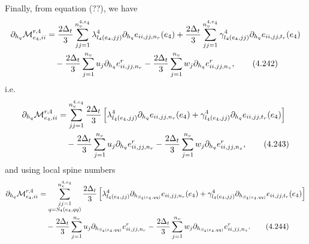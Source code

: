 \documentclass{article}
\begin{document}
Finally, from equation (??), we have
\begin{align}
\partial_{h_q}\mathcal{M}_{e_4,ii}^{r,4} &= \frac{2\Delta_t}{3} \sum_{jj=1}^{n_v^{4,e_4}} \lambda_{l_4(e_4,jj)}^4 \partial_{h_q} e_{ii,jj,n_r}(e_4) 
+ \frac{2\Delta_t}{3} \sum_{jj=1}^{n_v^{4,e_4}} \gamma_{l_4(e_4,jj)}^4 \partial_{h_q} e_{ii,jj,t_r}(e_4) \nonumber\\
&\quad - \frac{2\Delta_t}{3} \sum_{j=1}^{n_v} u_j \partial_{h_q} e_{ii,jj,n_r}^r 
- \frac{2\Delta_t}{3} \sum_{j=1}^{n_v} w_j \partial_{h_q} e_{ii,jj,n_z}^r, \tag{4.242}
\end{align}
i.e.
\begin{align}
\partial_{h_q}\mathcal{M}_{e_4,ii}^{r,4} &= \sum_{jj=1}^{n_v^{4,e_4}} \frac{2\Delta_t}{3} \left[ \lambda_{l_4(e_4,jj)}^4 \partial_{h_q} e_{ii,jj,n_r}(e_4) + \gamma_{l_4(e_4,jj)}^4 \partial_{h_q} e_{ii,jj,t_r}(e_4) \right] \nonumber\\
&\quad - \frac{2\Delta_t}{3} \sum_{j=1}^{n_v} u_j \partial_{h_q} e_{ii,jj,n_r}^r 
- \frac{2\Delta_t}{3} \sum_{j=1}^{n_v} w_j \partial_{h_q} e_{ii,jj,n_z}^r, \tag{4.243}
\end{align}
and using local spine numbers
\begin{align}
\partial_{h_q}\mathcal{M}_{e_4,ii}^{r,4} &= \sum_{\substack{jj=1\\ q=S_4(e_4,qq)}}^{n_v^{4,e_4}} \frac{2\Delta_t}{3} \left[ \lambda_{l_4(e_4,jj)}^4 \partial_{h_{S_4(e_4,qq)}} e_{ii,jj,n_r}(e_4) + \gamma_{l_4(e_4,jj)}^4 \partial_{h_{S_4(e_4,qq)}} e_{ii,jj,t_r}(e_4) \right] \nonumber\\
&\quad - \frac{2\Delta_t}{3} \sum_{j=1}^{n_v} u_j \partial_{h_{S_4(e_4,qq)}} e_{ii,jj,n_r}^r 
- \frac{2\Delta_t}{3} \sum_{j=1}^{n_v} w_j \partial_{h_{S_4(e_4,qq)}} e_{ii,jj,n_z}^r. \tag{4.244}
\end{align}
\end{document}
